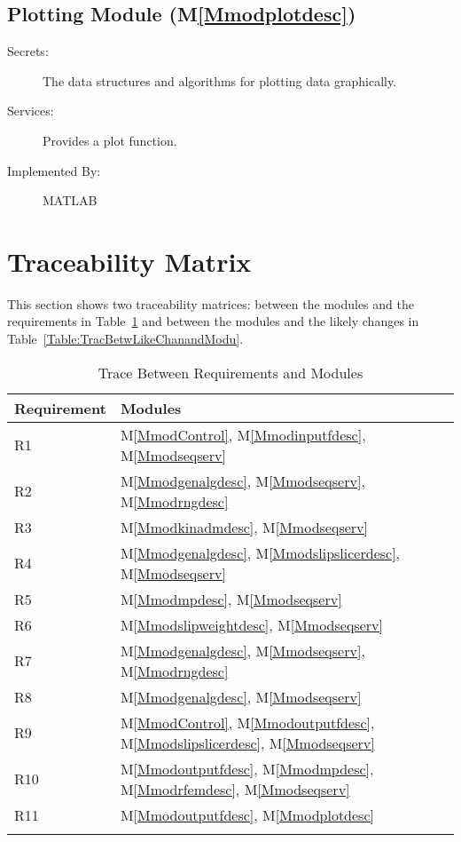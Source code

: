 \documentclass[12pt]{article}
\begin{document}
\subsection{Plotting Module (M\ref{Mmodplotdesc})}
\label{Sec:PlotModu()}
\begin{description}
\item[Secrets:]The data structures and algorithms for plotting data graphically.
\item[Services:]Provides a plot function.
\item[Implemented By:]MATLAB
\end{description}
\section{Traceability Matrix}
\label{Sec:TracMatr}
This section shows two traceability matrices: between the modules and the requirements in Table~\ref{Table:TracBetwRequandModu} and between the modules and the likely changes in Table~\ref{Table:TracBetwLikeChanandModu}.
\begin{longtable}{l l}
\toprule
Requirement & Modules
\\
\midrule
R1 & M\ref{MmodControl}, M\ref{Mmodinputfdesc}, M\ref{Mmodseqserv}
\\
R2 & M\ref{Mmodgenalgdesc}, M\ref{Mmodseqserv}, M\ref{Mmodrngdesc}
\\
R3 & M\ref{Mmodkinadmdesc}, M\ref{Mmodseqserv}
\\
R4 & M\ref{Mmodgenalgdesc}, M\ref{Mmodslipslicerdesc}, M\ref{Mmodseqserv}
\\
R5 & M\ref{Mmodmpdesc}, M\ref{Mmodseqserv}
\\
R6 & M\ref{Mmodslipweightdesc}, M\ref{Mmodseqserv}
\\
R7 & M\ref{Mmodgenalgdesc}, M\ref{Mmodseqserv}, M\ref{Mmodrngdesc}
\\
R8 & M\ref{Mmodgenalgdesc}, M\ref{Mmodseqserv}
\\
R9 & M\ref{MmodControl}, M\ref{Mmodoutputfdesc}, M\ref{Mmodslipslicerdesc}, M\ref{Mmodseqserv}
\\
R10 & M\ref{Mmodoutputfdesc}, M\ref{Mmodmpdesc}, M\ref{Mmodrfemdesc}, M\ref{Mmodseqserv}
\\
R11 & M\ref{Mmodoutputfdesc}, M\ref{Mmodplotdesc}
\\
\bottomrule
\caption{Trace Between Requirements and Modules}
\label{Table:TracBetwRequandModu}
\end{longtable}
\end{document}
